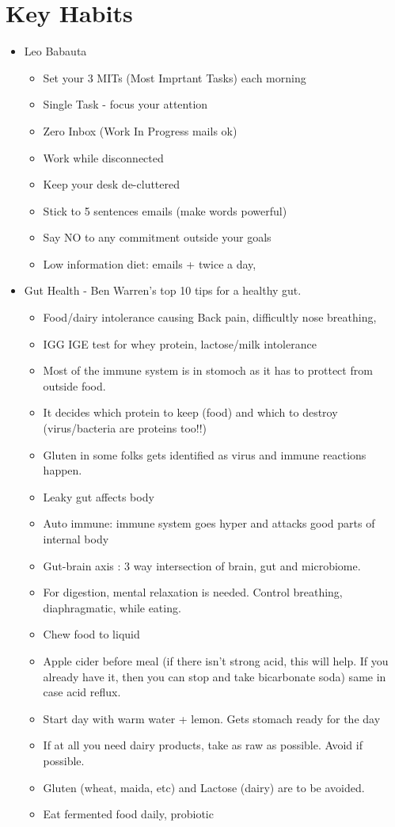 \section{Key Habits}
\begin{itemize}
\item Leo Babauta
	\begin{itemize}
	\item Set your 3 MITs (Most Imprtant Tasks) each morning
	\item Single Task - focus your attention
	\item Zero Inbox (Work In Progress mails ok)
	\item Work while disconnected
	\item Keep your desk de-cluttered
	\item Stick to 5 sentences emails (make words powerful)
	\item Say NO to any commitment outside your goals
	\item Low information diet: emails + twice a day, 
	\end{itemize}

\item Gut Health - Ben Warren's top 10 tips for a healthy gut.
	\begin{itemize}
	\item Food/dairy intolerance causing Back pain, difficultly nose breathing, 
	\item IGG IGE test for whey protein, lactose/milk intolerance
	\item Most of the immune system is in stomoch as it has to prottect from outside food.
	\item It decides which protein to keep (food) and which to destroy (virus/bacteria are proteins too!!)
	\item Gluten in some folks gets identified as virus and immune reactions happen.
	\item Leaky gut affects body
	\item Auto immune: immune system goes hyper and attacks good parts of internal body
	\item Gut-brain axis : 3 way intersection of brain, gut and microbiome.
	\item For digestion, mental relaxation is needed. Control breathing, diaphragmatic, while eating.
	\item Chew food to liquid
	\item Apple cider before meal (if there isn't strong acid, this will help. If you already have it, then you can stop and take bicarbonate soda) same in case acid reflux.
	\item Start day with warm water + lemon. Gets stomach ready for the day
	\item If at all you need dairy products, take as raw as possible. Avoid if possible.
	\item Gluten (wheat, maida, etc) and Lactose (dairy) are to be avoided.
	\item Eat fermented food daily, probiotic
	\end{itemize}
	

\end{itemize}
